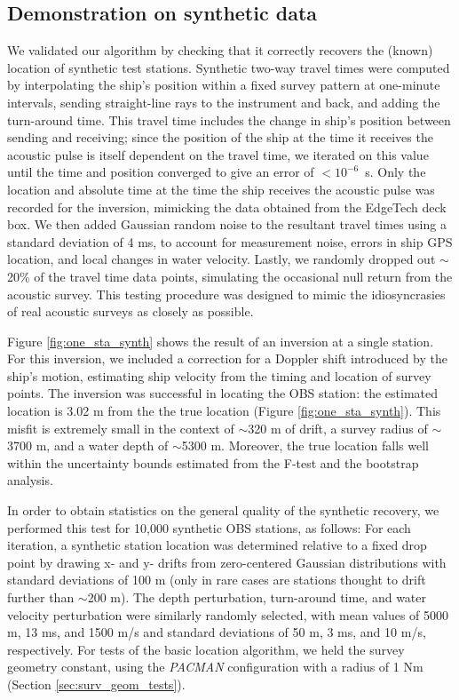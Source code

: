 
\subsection{Demonstration on synthetic data} \label{Demonstration on synthetic data}
We validated our algorithm by checking that it correctly recovers the (known) location of synthetic test stations. Synthetic two-way travel times were computed by interpolating the ship's position within a fixed survey pattern at one-minute intervals, sending straight-line rays to the instrument and back, and adding the turn-around time. This travel time includes the change in ship's position between sending and receiving; since the position of the ship at the time it receives the acoustic pulse is itself dependent on the travel time, we iterated on this value until the time and position converged to give an error of \mbox{$<10^{-6}$ s}. Only the location and absolute time at the time the ship receives the acoustic pulse was recorded for the inversion, mimicking the data obtained from the EdgeTech deck box. We then added Gaussian random noise to the resultant travel times using a standard deviation of 4 ms, to account for measurement noise, errors in ship GPS location, and local changes in water velocity. Lastly, we randomly dropped out $\sim$20\% of the travel time data points, simulating the occasional null return from the acoustic survey. This testing procedure was designed to mimic the idiosyncrasies of real acoustic surveys as closely as possible. 

Figure \ref{fig:one_sta_synth} shows the result of an inversion at a single station. For this inversion, we included a correction for a Doppler shift introduced by the ship's motion, estimating ship velocity from the timing and location of survey points. The inversion was successful in locating the OBS station: the estimated location is 3.02 m from the the true location (Figure \ref{fig:one_sta_synth}). This misfit is extremely small in the context of $\sim$320 m of drift, a survey radius of $\sim$3700 m, and a water depth of $\sim$5300 m. Moreover, the true location falls well within the uncertainty bounds estimated from the F-test and the bootstrap analysis. 

In order to obtain statistics on the general quality of the synthetic recovery, we performed this test for 10,000 synthetic OBS stations, as follows: For each iteration, a synthetic station location was determined relative to a fixed drop point by drawing x- and y- drifts from zero-centered Gaussian distributions with standard deviations of 100 m (only in rare cases are stations thought to drift further than $\sim$200 m). The depth perturbation, turn-around time, and water velocity perturbation were similarly randomly selected, with mean values of 5000 m, 13 ms, and 1500 m/s and standard deviations of 50 m, 3 ms, and 10 m/s, respectively.  For tests of the basic location algorithm, we held the survey geometry constant, using the \textit{PACMAN} configuration with a radius of 1 Nm (Section \ref{sec:surv_geom_tests}). 

